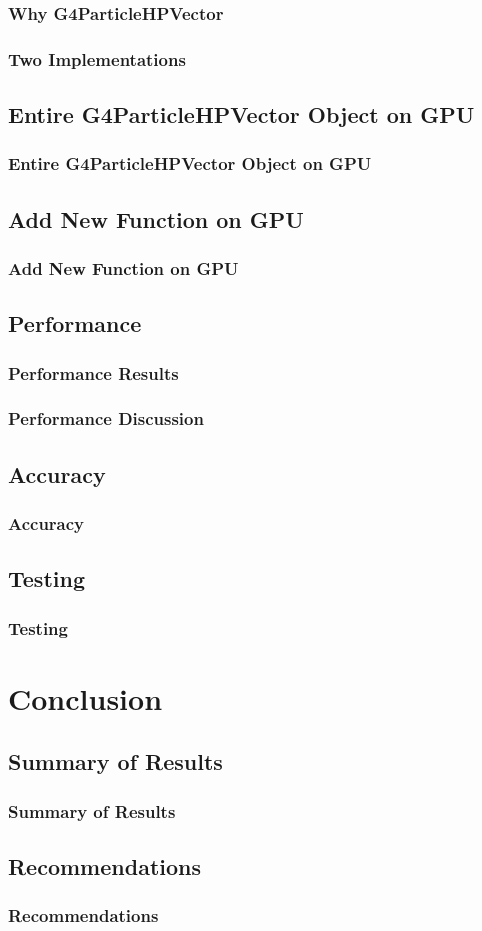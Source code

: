 \documentclass{beamer}
\begin{document}
\begin{frame}
\frametitle{Why G4ParticleHPVector}
\end{frame}

\begin{frame}
\frametitle{Two Implementations}
\end{frame}

\subsection{Entire G4ParticleHPVector Object on GPU}
\begin{frame}
\frametitle{Entire G4ParticleHPVector Object on GPU}
\end{frame}

\subsection{Add New Function on GPU}
\begin{frame}
\frametitle{Add New Function on GPU}
\end{frame}

\subsection{Performance}
\begin{frame}
\frametitle{Performance Results}
\end{frame}

\begin{frame}
\frametitle{Performance Discussion}
\end{frame}

\subsection{Accuracy}
\begin{frame}
\frametitle{Accuracy}
\end{frame}

\subsection{Testing}
\begin{frame}
\frametitle{Testing}
\end{frame}

\section{Conclusion}
\subsection{Summary of Results}
\begin{frame}
\frametitle{Summary of Results}
\end{frame}

\subsection{Recommendations}
\begin{frame}
\frametitle{Recommendations}
\end{frame}
\end{document}

